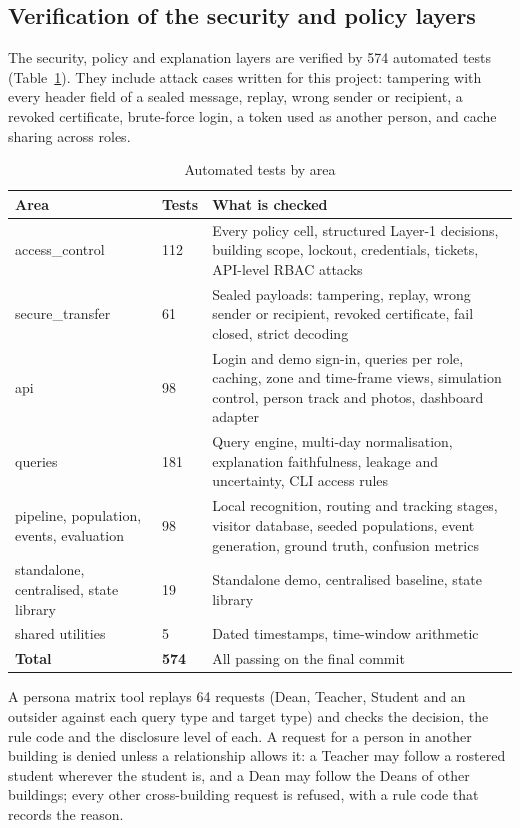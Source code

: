\documentclass[12pt,a4paper,oneside]{report}
\begin{document}
\subsection{Verification of the security and policy layers}\label{sec:res-security}
The security, policy and explanation layers are verified by 574 automated tests (Table~\ref{tab:tests}). They include attack cases written for this project: tampering with every header field of a sealed message, replay, wrong sender or recipient, a revoked certificate, brute-force login, a token used as another person, and cache sharing across roles.

\begin{table}[htbp]
\centering
\caption{Automated tests by area}\label{tab:tests}
{\small\setlength{\tabcolsep}{4pt}\renewcommand{\arraystretch}{1.2}
\begin{tabular}{|p{4.50cm}|p{1.37cm}|p{8.41cm}|}\hline
\textbf{Area} & \textbf{Tests} & \textbf{What is checked}\\\hline
access\_\allowbreak control & 112 & Every policy cell, structured Layer-1 decisions, building scope, lockout, credentials, tickets, API-level RBAC attacks\\\hline
secure\_\allowbreak transfer & 61 & Sealed payloads: tampering, replay, wrong sender or recipient, revoked certificate, fail closed, strict decoding\\\hline
api & 98 & Login and demo sign-in, queries per role, caching, zone and time-frame views, simulation control, person track and photos, dashboard adapter\\\hline
queries & 181 & Query engine, multi-day normalisation, explanation faithfulness, leakage and uncertainty, CLI access rules\\\hline
pipeline, population, events, evaluation & 98 & Local recognition, routing and tracking stages, visitor database, seeded populations, event generation, ground truth, confusion metrics\\\hline
standalone, centralised, state library & 19 & Standalone demo, centralised baseline, state library\\\hline
shared utilities & 5 & Dated timestamps, time-window arithmetic\\\hline
\textbf{Total} & \textbf{574} & All passing on the final commit\\\hline
\end{tabular}}
\end{table}

A persona matrix tool replays 64 requests (Dean, Teacher, Student and an outsider against each query type and target type) and checks the decision, the rule code and the disclosure level of each. A request for a person in another building is denied unless a relationship allows it: a Teacher may follow a rostered student wherever the student is, and a Dean may follow the Deans of other buildings; every other cross-building request is refused, with a rule code that records the reason.
\end{document}
